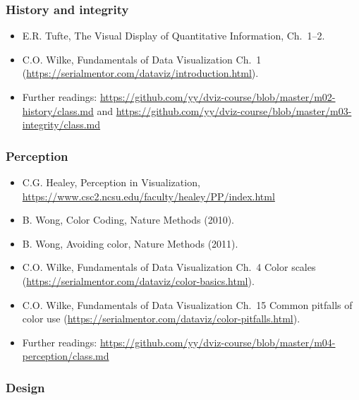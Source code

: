 \subsubsection{History and integrity}%

\begin{itemize}\itemsep0em 
\item E.R. Tufte, The Visual Display of Quantitative Information, Ch.~1--2.
\item C.O. Wilke, Fundamentals of Data Visualization Ch.~1 (\url{https://serialmentor.com/dataviz/introduction.html}). 
\item Further readings: \url{https://github.com/yy/dviz-course/blob/master/m02-history/class.md} and \url{https://github.com/yy/dviz-course/blob/master/m03-integrity/class.md}
\end{itemize}	


\subsubsection{Perception}%

\begin{itemize}\itemsep0em 
\item C.G. Healey, Perception in Visualization, \url{https://www.csc2.ncsu.edu/faculty/healey/PP/index.html}
\item B. Wong, Color Coding, Nature Methods (2010).
\item B. Wong, Avoiding color, Nature Methods (2011). 
\item C.O. Wilke, Fundamentals of Data Visualization Ch.~4 Color scales (\url{https://serialmentor.com/dataviz/color-basics.html}). 
\item C.O. Wilke, Fundamentals of Data Visualization Ch.~15 Common pitfalls of color use (\url{https://serialmentor.com/dataviz/color-pitfalls.html}).
\item Further readings: \url{https://github.com/yy/dviz-course/blob/master/m04-perception/class.md}
\end{itemize}	
\subsubsection{Design }%

